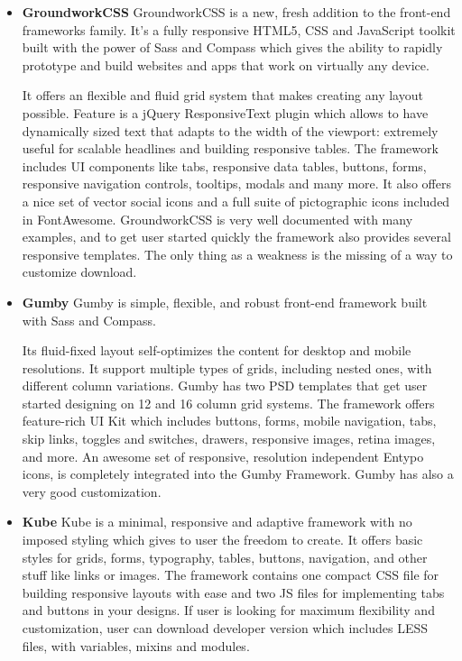 \begin{itemize}
	\item \textbf{GroundworkCSS}
	\newline
	GroundworkCSS is a new, fresh addition to the front-end frameworks family. It’s a fully responsive HTML5, CSS and JavaScript toolkit built with the power of Sass and Compass which gives the ability to rapidly prototype and build websites and apps that work on virtually any device.

	It offers an flexible and fluid grid system that makes creating any layout possible. Feature is a jQuery ResponsiveText plugin which allows to have dynamically sized text that adapts to the width of the viewport: extremely useful for scalable headlines and building responsive tables. The framework includes UI components like tabs, responsive data tables, buttons, forms, responsive navigation controls, tooltips, modals and many more. It also offers a nice set of vector social icons and a full suite of pictographic icons included in FontAwesome. GroundworkCSS is very well documented with many examples, and to get user started quickly the framework also provides several responsive templates. The only thing as a weakness is the missing of a way to customize download.

	\item \textbf{Gumby}            
	\newline
	Gumby is simple, flexible, and robust front-end framework built with Sass and Compass.

	Its fluid-fixed layout self-optimizes the content for desktop and mobile resolutions. It support multiple types of grids, including nested ones, with different column variations. Gumby has two PSD templates that get user started designing on 12 and 16 column grid systems. The framework offers feature-rich UI Kit which includes buttons, forms, mobile navigation, tabs, skip links, toggles and switches, drawers, responsive images, retina images, and more. An awesome set of responsive, resolution independent Entypo icons, is completely integrated into the Gumby Framework. Gumby has also a very good customization. 
	
	\item \textbf{Kube}
	\newline
    Kube is a minimal, responsive and adaptive framework with no imposed styling which gives to user the freedom to create. It offers basic styles for grids, forms, typography, tables, buttons, navigation, and other stuff like links or images. The framework contains one compact CSS file for building responsive layouts with ease and two JS files for implementing tabs and buttons in your designs. If user is looking for maximum flexibility and customization, user can download developer version which includes LESS files, with variables, mixins and modules.
	\end{itemize}

